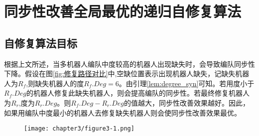 
\chapter{同步性改善全局最优的递归自修复算法}

\section{自修复算法目标}
根据上文所述，当多机器人编队中度较高的机器人出现缺失时，会导致编队同步性下降。假设在图\ref{fig:修复路径对比}中,空缺位置表示出现机器人缺失，记缺失机器人为$R_f$,则缺失机器人的度${R_f}.Deg = 6$。由引理\ref{lem:degree_syn}可知。若用度小于$R_f.Deg$的机器人修复此缺失机器人，则会提高编队的同步性。若最终修复机器人为$R_r$,度为$R_r.Deg$。则$R_f.Deg-R_r.Deg$的值越大，同步性改善效果越好。因此，如果用编队中度最小的机器人去修复缺失机器人则会使同步性改善效果最优。
\begin{figure}[!htbp]
	\centering
	\texttt{[image: chapter3/figure3-1.png]}
\end{figure}

